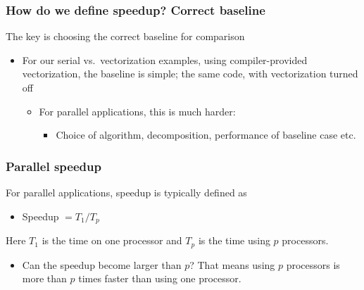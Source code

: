 \documentclass{beamer}
\begin{document}
\begin{frame}
\frametitle{How do we define speedup? Correct baseline}

\begin{block}{}
The key is choosing the correct baseline for comparison
\begin{itemize}
\item For our serial vs.~vectorization examples, using compiler-provided vectorization, the baseline is simple; the same code, with vectorization turned off
\begin{itemize}

 \item For parallel applications, this is much harder:
\begin{itemize}

  \item Choice of algorithm, decomposition, performance of baseline case etc.
\end{itemize}

\noindent
\end{itemize}

\noindent
\end{itemize}

\noindent
\end{block}
\end{frame}

\begin{frame}
\frametitle{Parallel  speedup}

\begin{block}{}
For parallel applications, speedup  is typically defined as
\begin{itemize}
\item Speedup $=T_1/T_p$
\end{itemize}

\noindent
Here  $T_1$ is the time on one processor and $T_p$ is the time using $p$ processors.
\begin{itemize}
 \item Can the speedup become larger than  $p$? That means using $p$ processors is more than $p$ times faster than using one processor.
\end{itemize}

\noindent
\end{block}
\end{frame}
\end{document}
